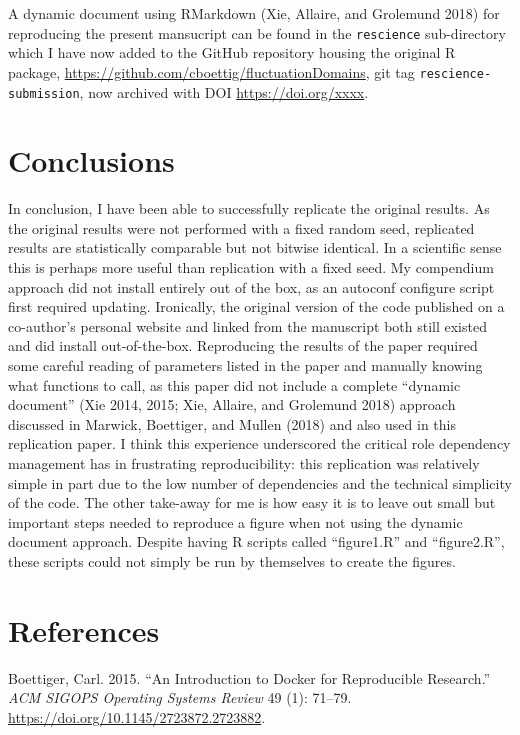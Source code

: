 \documentclass[
]{rescience}
\begin{document}
A dynamic document using RMarkdown (Xie, Allaire, and Grolemund 2018)
for reproducing the present mansucript can be found in the
\texttt{rescience} sub-directory which I have now added to the GitHub
repository housing the original R package,
\url{https://github.com/cboettig/fluctuationDomains}, git tag
\texttt{rescience-submission}, now archived with DOI
\url{https://doi.org/xxxx}.

\hypertarget{conclusions}{%
\section{Conclusions}\label{conclusions}}

In conclusion, I have been able to successfully replicate the original
results. As the original results were not performed with a fixed random
seed, replicated results are statistically comparable but not bitwise
identical. In a scientific sense this is perhaps more useful than
replication with a fixed seed. My compendium approach did not install
entirely out of the box, as an autoconf configure script first required
updating. Ironically, the original version of the code published on a
co-author's personal website and linked from the manuscript both still
existed and did install out-of-the-box. Reproducing the results of the
paper required some careful reading of parameters listed in the paper
and manually knowing what functions to call, as this paper did not
include a complete ``dynamic document'' (Xie 2014, 2015; Xie, Allaire,
and Grolemund 2018) approach discussed in Marwick, Boettiger, and Mullen
(2018) and also used in this replication paper. I think this experience
underscored the critical role dependency management has in frustrating
reproducibility: this replication was relatively simple in part due to
the low number of dependencies and the technical simplicity of the code.
The other take-away for me is how easy it is to leave out small but
important steps needed to reproduce a figure when not using the dynamic
document approach. Despite having R scripts called ``figure1.R'' and
``figure2.R'', these scripts could not simply be run by themselves to
create the figures.

\hypertarget{references}{%
\section*{References}\label{references}}

\hypertarget{refs}{}
\leavevmode\hypertarget{ref-Boettiger2015}{}%
Boettiger, Carl. 2015. ``An Introduction to Docker for Reproducible
Research.'' \emph{ACM SIGOPS Operating Systems Review} 49 (1): 71--79.
\url{https://doi.org/10.1145/2723872.2723882}.
\end{document}

